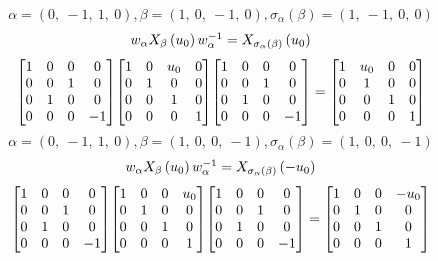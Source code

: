 \documentclass[11pt]{article}
\theoremstyle{definition}
\begin{document}
\[
\alpha = \left( 0, \  -1, \  1, \  0\right), \beta = \left( 1, \  0, \  -1, \  0\right), \sigma_{\alpha}(\beta) = \left( 1, \  -1, \  0, \  0\right)
\]
\[
\scaletoalign{\textwidth}{w_{\alpha} X_{\beta}\left(u_{0}\right) w_{\alpha}^{-1} = X_{\sigma_{\alpha}\left(\beta\right)}\left(u_{0}\right)}
\]
\[
\scaletoalign{\textwidth}{{\left[\begin{matrix}1 & 0 & 0 & 0\\0 & 0 & 1 & 0\\0 & 1 & 0 & 0\\0 & 0 & 0 & -1\end{matrix}\right]} {\left[\begin{matrix}1 & 0 & u_{0} & 0\\0 & 1 & 0 & 0\\0 & 0 & 1 & 0\\0 & 0 & 0 & 1\end{matrix}\right]} {\left[\begin{matrix}1 & 0 & 0 & 0\\0 & 0 & 1 & 0\\0 & 1 & 0 & 0\\0 & 0 & 0 & -1\end{matrix}\right]} = {\left[\begin{matrix}1 & u_{0} & 0 & 0\\0 & 1 & 0 & 0\\0 & 0 & 1 & 0\\0 & 0 & 0 & 1\end{matrix}\right]}}
\]
\[
\alpha = \left( 0, \  -1, \  1, \  0\right), \beta = \left( 1, \  0, \  0, \  -1\right), \sigma_{\alpha}(\beta) = \left( 1, \  0, \  0, \  -1\right)
\]
\[
\scaletoalign{\textwidth}{w_{\alpha} X_{\beta}\left(u_{0}\right) w_{\alpha}^{-1} = X_{\sigma_{\alpha}\left(\beta\right)}\left(- u_{0}\right)}
\]
\[
\scaletoalign{\textwidth}{{\left[\begin{matrix}1 & 0 & 0 & 0\\0 & 0 & 1 & 0\\0 & 1 & 0 & 0\\0 & 0 & 0 & -1\end{matrix}\right]} {\left[\begin{matrix}1 & 0 & 0 & u_{0}\\0 & 1 & 0 & 0\\0 & 0 & 1 & 0\\0 & 0 & 0 & 1\end{matrix}\right]} {\left[\begin{matrix}1 & 0 & 0 & 0\\0 & 0 & 1 & 0\\0 & 1 & 0 & 0\\0 & 0 & 0 & -1\end{matrix}\right]} = {\left[\begin{matrix}1 & 0 & 0 & - u_{0}\\0 & 1 & 0 & 0\\0 & 0 & 1 & 0\\0 & 0 & 0 & 1\end{matrix}\right]}}
\]
\end{document}
